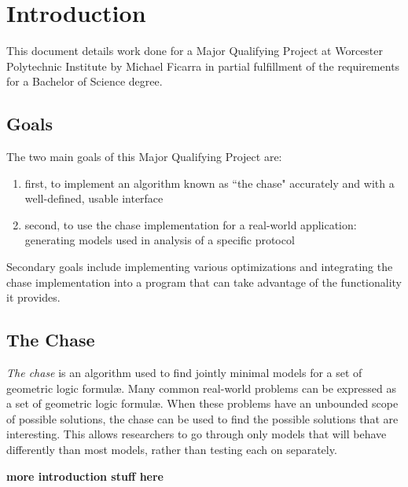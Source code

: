 \section{Introduction}

	This document details work done for a Major Qualifying Project at Worcester
	Polytechnic Institute by Michael Ficarra in partial fulfillment of the
	requirements for a Bachelor of Science degree.

	\subsection{Goals}

		The two main goals of this Major Qualifying Project are:

		\begin{enumerate}
		\item first, to implement an algorithm known as ``the chase" accurately
		and with a well-defined, usable interface
		\item second, to use the chase implementation for a real-world
		application: generating models used in analysis of a specific protocol
		\end{enumerate}

		Secondary goals include implementing various optimizations and
		integrating the chase implementation into a program that can take
		advantage of the functionality it provides.

	\subsection{The Chase}

		\emph{The chase} is an algorithm used to find jointly minimal models
		for a set of geometric logic formul{\ae}. Many common real-world
		problems can be expressed as a set of geometric logic formul{\ae}.
		When these problems have an unbounded scope of possible solutions, the
		chase can be used to find the possible solutions that are interesting.
		This allows researchers to go through only models that will behave
		differently than most models, rather than testing each on separately.

		\textbf{ more introduction stuff here }

